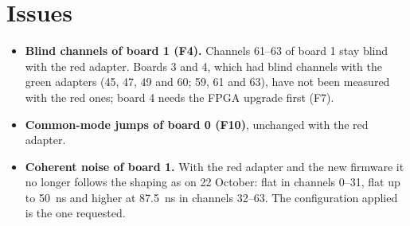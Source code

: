 \documentclass[11pt,a4paper]{article}
\begin{document}
\section{Issues}

\begin{itemize}
\item \textbf{Blind channels of board 1 (F4).} Channels 61--63 of board 1 stay blind with the
  red adapter. Boards 3 and 4, which had blind channels with the green adapters (45, 47, 49 and
  60; 59, 61 and 63), have not been measured with the red ones; board 4 needs the FPGA upgrade
  first (F7).
\item \textbf{Common-mode jumps of board 0 (F10)}, unchanged with the red adapter.
\item \textbf{Coherent noise of board 1.} With the red adapter and the new firmware it no longer
  follows the shaping as on 22 October: flat in channels 0--31, flat up to 50~ns and higher at
  87.5~ns in channels 32--63. The configuration applied is the one requested.
\end{itemize}
\end{document}
